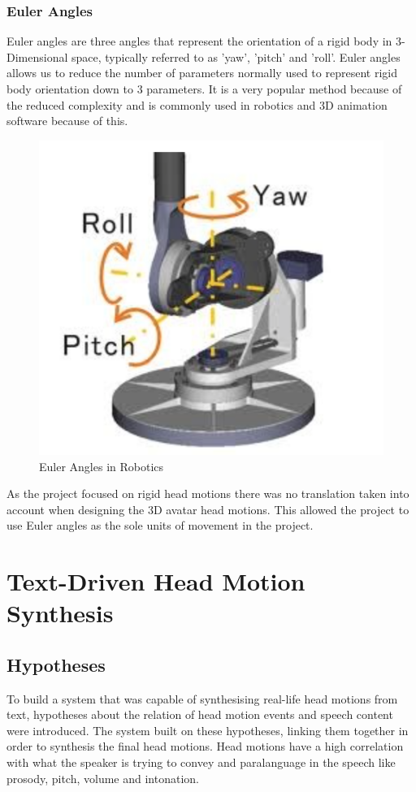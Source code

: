 \documentclass[bsc,frontabs,twoside,singlespacing,parskip]{infthesis}
\begin{document}
\subsection{Euler Angles}

Euler angles are three angles that represent the orientation of a rigid body in 3-Dimensional space, typically referred to as 'yaw', 'pitch' and 'roll'. Euler angles allows us to reduce the number of parameters normally used to represent rigid body orientation down to 3 parameters. It is a very popular method because of the reduced complexity and is commonly used in robotics and 3D animation software because of this. 

\begin{figure}[h!]
	\caption{Euler Angles in Robotics}
	\centering
	\includegraphics[width=.5\textwidth]{euler_angles.png}
\end{figure}

As the project focused on rigid head motions there was no translation taken into account when designing the 3D avatar head motions. This allowed the project to use Euler angles as the sole units of movement in the project.


\chapter{Text-Driven Head Motion Synthesis}

\section{Hypotheses}

To build a system that was capable of synthesising real-life head motions from text, hypotheses about the relation of head motion events and speech content were introduced. The system built on these hypotheses, linking them together in order to synthesis the final head motions. Head motions have a high correlation with what the speaker is trying to convey and paralanguage in the speech like prosody, pitch, volume and intonation.  
\end{document}
